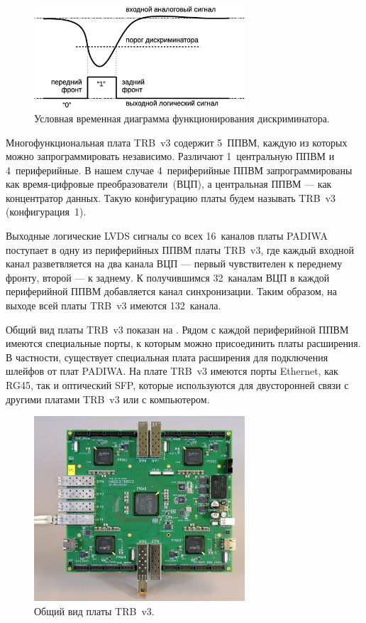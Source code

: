 \begin{figure}[H]
\centering
\includegraphics[width=0.7\textwidth]{pictures/6_Discrimination_rus.eps}
\caption{Условная временная диаграмма функционирования дискриминатора.}
\label{fig:Discrimination}
\end{figure}

Многофункциональная плата TRB~v3 содержит 5~ППВМ, каждую из которых можно запрограммировать независимо. Различают 1~центральную ППВМ и 4~периферийные. В нашем случае 4~периферийные ППВМ запрограммированы как время-цифровые преобразователи~(ВЦП), а центральная ППВМ --- как концентратор данных. Такую конфигурацию платы будем называть TRB~v3 (конфигурация~1).

Выходные логические LVDS сигналы со всех 16~каналов платы PADIWA поступает в одну из периферийных ППВМ платы TRB~v3, где каждый входной канал разветвляется на два канала ВЦП --- первый чувствителен к переднему фронту, второй --- к заднему. К получившимся 32~каналам ВЦП в каждой периферийной ППВМ добавляется канал синхронизации. Таким образом, на выходе всей платы TRB~v3 имеются 132~канала.

Общий вид платы TRB~v3 показан на . Рядом с каждой периферийной ППВМ имеются специальные порты, к которым можно присоединить платы расширения. В частности, существует специальная плата расширения для подключения шлейфов от плат PADIWA. На плате TRB~v3 имеются порты Ethernet, как RG45, так и оптический SFP, которые используются для двусторонней связи с другими платами TRB~v3 или с компьютером.

\begin{figure}[H]
\centering
\includegraphics[width=0.7\textwidth]{pictures/7_TRB3_crop.jpg}
\caption{Общий вид платы TRB~v3.}
\label{fig:TRB}
\end{figure}

